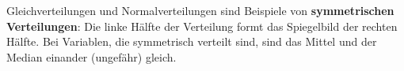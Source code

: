 \documentclass[oneside, 10pt]{book}\usepackage[]{graphicx}\usepackage[]{xcolor}
\begin{document}
Gleichverteilungen und Normalverteilungen sind Beispiele von \textbf{symmetrischen Verteilungen}: Die linke Hälfte der Verteilung formt
das Spiegelbild der rechten Hälfte. Bei Variablen, die symmetrisch verteilt sind, sind das Mittel und der Median einander (ungefähr) gleich.



%
\end{document}
